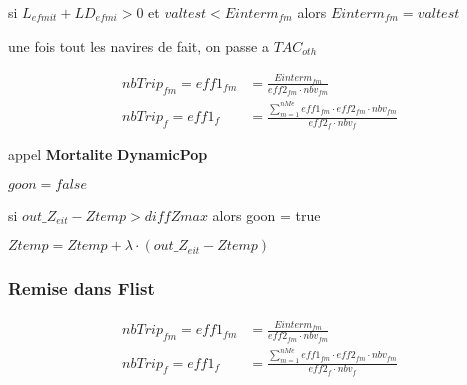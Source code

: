 \documentclass[12pt, colorinlistoftodos]{article}
\begin{document}
si $L_{efmit} + LD_{efmi} > 0 $ et $ valtest < Einterm_{fm} $ alors $Einterm_{fm} = valtest$

une fois tout les navires de fait, on passe a $TAC_{oth}$


\begin{align}
    nbTrip_{fm} = eff1_{fm} &= \frac{Einterm_{fm}}{eff2_{fm} \cdot nbv_{fm}}  \\
    nbTrip_{f} = eff1_{f} &= \frac{\sum_{m=1}^{nMe} eff1_{fm} \cdot eff2_{fm} \cdot nbv_{fm}}{eff2_f \cdot nbv_f} 
\end{align}

appel \textbf{Mortalite} \textbf{DynamicPop}

$goon = false$

si $out\_Z_{eit} - Ztemp > diffZmax$ alors goon = true

$Ztemp = Ztemp + \lambda \cdot (out\_Z_{eit} - Ztemp)$


\subsubsection{Remise dans Flist}

\begin{align}
    nbTrip_{fm} = eff1_{fm} &= \frac{Einterm_{fm}}{eff2_{fm} \cdot nbv_{fm}}  \\
    nbTrip_{f} = eff1_{f} &= \frac{\sum_{m=1}^{nMe} eff1_{fm} \cdot eff2_{fm} \cdot nbv_{fm}}{eff2_f \cdot nbv_f} 
\end{align}
\end{document}
